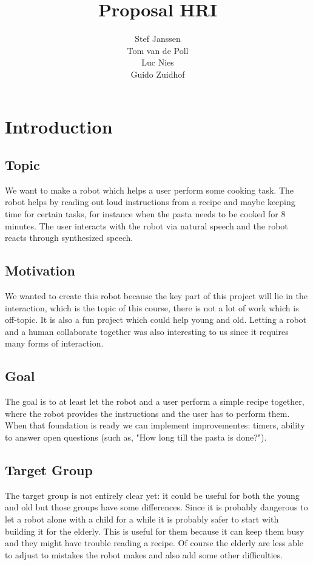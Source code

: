 \documentclass[11pt]{article} %
\title{Proposal HRI }
\author{Stef Janssen\\
	Tom van de Poll\\
	Luc Nies\\
	Guido Zuidhof}
\begin{document}
\maketitle

\section{Introduction}

\subsection{Topic} We want to make a robot which helps a user perform some cooking task. The robot helps by reading out loud instructions from a recipe and maybe keeping time for certain tasks, for instance when the pasta needs to be cooked for 8 minutes. The user interacts with the robot via natural speech and the robot reacts through synthesized speech.

\subsection{Motivation} We wanted to create this robot because the key part of this project will lie in the interaction, which is the topic of this course, there is not a lot of work which is off-topic. It is also a fun project which could help young and old. Letting a robot and a human collaborate together was also interesting to us since it requires many forms of interaction. 

\subsection{Goal} The goal is to at least let the robot and a user perform a simple recipe together, where the robot provides the instructions and the user has to perform them. When that foundation is ready we can implement improvementes: timers, ability to answer open questions (such as, "How long till the pasta is done?").

\subsection{Target Group} The target group is not entirely clear yet: it could be useful for both the young and old but those groups have some differences. Since it is probably dangerous to let a robot alone with a child for a while it is probably safer to start with building it for the elderly. This is useful for them because it can keep them busy and they might have trouble reading a recipe. Of course the elderly are less able to adjust to mistakes the robot makes and also add some other difficulties.
\end{document}
